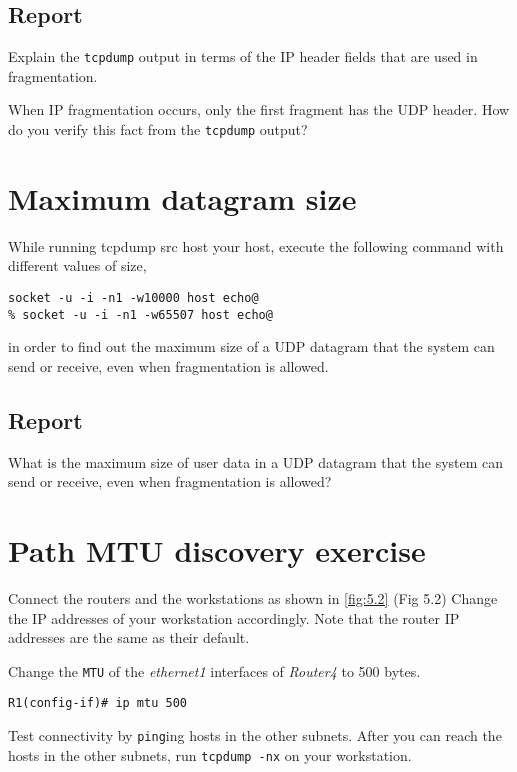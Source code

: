\documentclass{../UTNetLab}
\begin{document}
    \subsection*{Report}
	Explain the \lstinline{tcpdump} output in terms of the IP header fields that are used in fragmentation.

	When IP fragmentation occurs, only the first fragment has the UDP header.
	How do you verify this fact from the \lstinline{tcpdump} output?


\section{Maximum datagram size}
\label{sec:MaxDatagramSize}
	While running tcpdump src host your host, execute the following command with different values of size,
	\begin{lstlisting}[emph={host}]
socket -u -i -n1 -w10000 host echo@
% socket -u -i -n1 -w65507 host echo@
	\end{lstlisting}
	in order to find out the maximum size of a UDP datagram that the system can send or receive, even when fragmentation is allowed.

\subsection*{Report}
	What is the maximum size of user data in a UDP datagram that the system can send or receive, even when fragmentation is allowed?


\section*{Path MTU discovery exercise}
	Connect the routers and the workstations as shown in \autoref{fig:5.2} (Fig 5.2) Change the IP
	addresses of your workstation accordingly. Note that the router IP addresses are
	the same as their default.


	Change the \texttt{MTU} of the \textit{ethernet1} interfaces of \textit{Router4} to 500
	bytes.
	\begin{lstlisting}[language={cisco}]
R1(config-if)# ip mtu 500
	\end{lstlisting}
	Test connectivity by \lstinline{ping}ing hosts in the other subnets. After you can reach the
	hosts in the other subnets, run \lstinline{tcpdump -nx} on your workstation.
\end{document}

